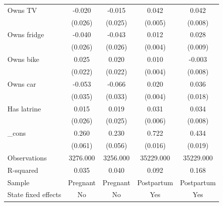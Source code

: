 \begin{table}[htbp]
\begin{tabular}{l*{4}{c}}
Owns TV             &      -0.020         &      -0.015         &       0.042\sym{***}&       0.042\sym{***}\\
                    &     (0.026)         &     (0.025)         &     (0.005)         &     (0.008)         \\
Owns fridge         &      -0.040         &      -0.043\sym{*}  &       0.012\sym{***}&       0.028\sym{***}\\
                    &     (0.026)         &     (0.026)         &     (0.004)         &     (0.009)         \\
Owns bike           &       0.025         &       0.020         &       0.010\sym{**} &      -0.003         \\
                    &     (0.022)         &     (0.022)         &     (0.004)         &     (0.008)         \\
Owns car            &      -0.053         &      -0.066\sym{**} &       0.020\sym{***}&       0.036\sym{**} \\
                    &     (0.035)         &     (0.033)         &     (0.004)         &     (0.018)         \\
Has latrine         &       0.015         &       0.019         &       0.031\sym{***}&       0.034\sym{***}\\
                    &     (0.026)         &     (0.025)         &     (0.006)         &     (0.008)         \\
\_cons              &       0.260\sym{***}&       0.230\sym{***}&       0.722\sym{***}&       0.434\sym{***}\\
                    &     (0.061)         &     (0.056)         &     (0.016)         &     (0.019)         \\
\hline
Observations        &    3276.000         &    3256.000         &   35229.000         &   35229.000         \\
R-squared           &       0.035         &       0.040         &       0.092         &       0.168         \\
Sample              &    Pregnant         &    Pregnant         &  Postpartum         &  Postpartum         \\
State fixed effects &          No         &          No         &         Yes         &         Yes         \\
\hline\hline
\end{tabular}
\end{table}
